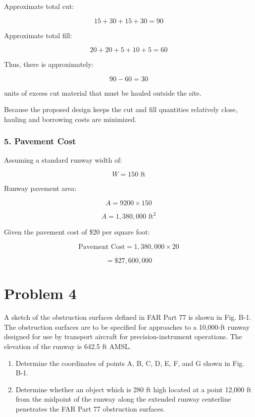\documentclass{KPS_assignment}
\begin{document}
\begin{enumerate}
Approximate total cut:

\[
15+30+15+30=90
\]

Approximate total fill:

\[
20+20+5+10+5=60
\]

Thus, there is approximately:

\[
90-60=30
\]

units of excess cut material that must be hauled outside the site.

Because the proposed design keeps the cut and fill quantities relatively close, hauling and borrowing costs are minimized.

\subsubsection*{5. Pavement Cost}

Assuming a standard runway width of:

\[
W = 150 \text{ ft}
\]

Runway pavement area:

\[
A = 9200 \times 150
\]

\[
A = 1{,}380{,}000 \text{ ft}^2
\]

Given the pavement cost of \$20 per square foot:

\[
\text{Pavement Cost}
=
1{,}380{,}000 \times 20
\]

\[
=
\$27{,}600{,}000
\]


\section*{Problem 4}

A sketch of the obstruction surfaces defined in FAR Part 77 is shown in Fig. B-1. The obstruction surfaces are to be specified for approaches to a 10,000-ft runway designed for use by transport aircraft for precision-instrument operations. The elevation of the runway is 642.5 ft AMSL.

\begin{enumerate}
    \item[(a)] Determine the coordinates of points A, B, C, D, E, F, and G shown in Fig. B-1.
    
    \item[(b)] Determine whether an object which is 280 ft high located at a point 12,000 ft from the midpoint of the runway along the extended runway centerline penetrates the FAR Part 77 obstruction surfaces.
    

\end{enumerate}
\end{enumerate}
\end{document}

